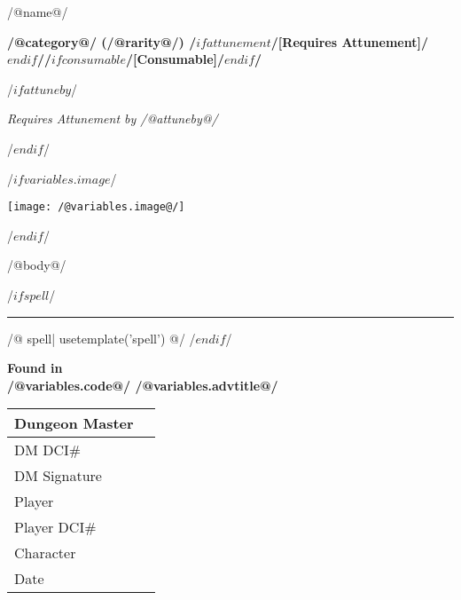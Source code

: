 \begin{itemcert}{/@name@/}
\centerline{\textbf{/@category@/ (/@rarity@/) /$if attunement $/[Requires Attunement]/$endif$//$if consumable $/[Consumable]/$endif$/}}
/$ if attuneby $/
\centerline{\textit{Requires Attunement by /@attuneby@/}}
/$endif$/

/$ if variables.image $/
\centerline{\texttt{[image: /@variables.image@/]}}
/$endif$/

/@body@/

/$ if spell $/
\vspace*{0.5em}
\hrule
\vspace*{0.5em}
/@ spell| usetemplate('spell') @/
/$endif$/

\tcblower
\begin{center}
\textbf{Found in\\/@variables.code@/ /@variables.advtitle@/}
\end{center}
\begin{center}
\begin{tabularx}{\textwidth}{|l|X|}
\hline
\small
\cellcolor{gray}\color{white} Dungeon Master & \\ \hline
\cellcolor{gray}\color{white} DM DCI\# & \\ \hline
\cellcolor{gray}\color{white} DM Signature & \\ \hline
\cellcolor{gray}\color{white} Player & \\ \hline
\cellcolor{gray}\color{white} Player DCI\# & \\ \hline
\cellcolor{gray}\color{white} Character & \\ \hline
\cellcolor{gray}\color{white} Date & \\ \hline
\end{tabularx}
\end{center}
\end{itemcert}